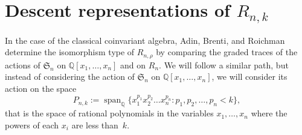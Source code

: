 \documentclass[10pt]{article}
\newcommand{\coloneqq}{:=}
\newcommand{\spanrm}{\operatorname{span}}\newcommand{\Rise}{\operatorname{Rise}}\newcommand{\Val}{\operatorname{Val}}
\begin{document}
\section{Descent representations of \texorpdfstring{$R_{n,k}$}{Rn,k}}
\label{Rnk}
In the case of the classical coinvariant algebra, Adin, Brenti, and Roichman determine the isomorphism type of $R_{n,\rho}$ by 
comparing the graded traces of the actions of $\mathfrak{S}_n$ on $\mathbb{Q}[x_1,\ldots, x_n]$ and on $R_{n}$. We will 
follow a similar path, but instead of considering the action of $\mathfrak{S}_n$ on $\mathbb{Q}[x_1,\ldots, x_n]$, we will 
consider its action on the space 
		\begin{equation}
P_{n,k}\coloneqq \spanrm_{\mathbb{Q}}\{ x_1^{p_1}x_2^{p_2}\ldots x_n^{p_n}:p_1,p_2,\ldots, 
p_n<k\},
\end{equation}
that is the space of rational polynomials in the variables $x_1,\ldots, x_n$ where the powers of each $x_i$ are less than~$k$.
\end{document}
